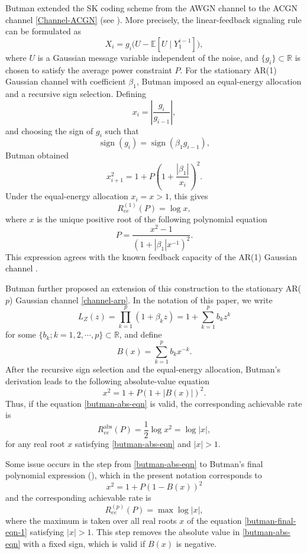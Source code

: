 \documentclass[12pt]{article}
\begin{document}
Butman extended the SK coding scheme from the AWGN channel to the ACGN channel \eqref{Channel-ACGN} (see \cite{butman1969,butman1976linear}). More precisely, the linear-feedback signaling rule can be formulated as
$$
    X_i=g_i\bigl(U-\mathbb E[U\mid Y_1^{i-1}]\bigr),
$$
where $U$ is a Gaussian message variable independent of the noise, and \(\{g_i\}\subset\mathbb R\) is chosen to satisfy the average power constraint $P$. For the stationary AR(1) Gaussian channel with coefficient \(\beta_1\), Butman imposed an equal-energy allocation and a recursive sign selection. Defining
\begin{equation}
    x_i=\left|\frac{g_i}{g_{i-1}}\right|,
\end{equation}
and choosing the sign of \(g_i\) such that
\begin{equation}
    \operatorname{sign}(g_i)=\operatorname{sign}(\beta_1 g_{i-1}),
\end{equation}
Butman obtained
\[
    x_{i+1}^2 = 1+P\left(1+\frac{|\beta_1|}{x_i}\right)^2 .
\]
Under the equal-energy allocation \(x_i=x>1\), this gives
\begin{equation}\label{butman-original-rate:label}
    R^{(1)}_{ee}(P)=\log x,
\end{equation}
where $x$ is the unique positive root of the following polynomial equation
\[
    P=\frac{x^2-1}{(1+|\beta_1|x^{-1})^2}.
\]
This expression agrees with the known feedback capacity of the AR(1) Gaussian channel \cite{kim2009feedback,yang2007feedback,sabag2023}.

Butman further proposed an extension of this construction to the stationary AR($p$) Gaussian channel \eqref{channel-arp}. In the notation of this paper, we write
\[
    L_Z(z)=\prod_{k=1}^{p}(1+\beta_k z)
          =1+\sum_{k=1}^{p}b_k z^k
\]
for some $\{b_k;k=1,2,\cdots,p\}\subset \mathbb{R}$, and define
\[
    B(x)=\sum_{k=1}^{p}b_kx^{-k}.
\]
After the recursive sign selection and the equal-energy allocation, Butman's derivation leads to the following absolute-value equation
\begin{equation}\label{butman-abs-eqn}
    x^2= 1+ P\left(1+|B(x)|\right)^2 .
\end{equation}
Thus, if the equation \eqref{butman-abs-eqn} is valid, the corresponding achievable rate is
$$
    R^\mathrm{abs}_{ee}(P)=\frac12\log x^2=\log|x|,
$$
for any real root $x$ satisfying \eqref{butman-abs-eqn} and $|x|>1$.

Some issue occurs in the step from \eqref{butman-abs-eqn} to Butman's final polynomial expression (\cite[Equation (49)]{butman1976linear}), which in the present notation corresponds to
\begin{equation}\label{butman-final-eqn-1}
    x^2= 1+ P\left(1-B(x)\right)^2
\end{equation}
and the corresponding achievable rate is 
\begin{equation}\label{Butman-ARp-mutual-info}
    R_{ee}^{(p)}(P) = \max \log|x|, 
\end{equation}
where the maximum is taken over all real roots $x$ of the equation \eqref{butman-final-eqn-1} satisfying $|x|>1$. This step removes the absolute value in \eqref{butman-abs-eqn} with a fixed sign, which is valid if $B(x)$ is negative.
\end{document}
